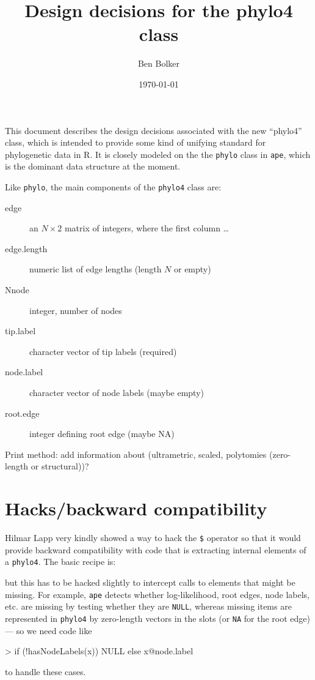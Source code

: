 \documentclass{article}
\title{Design decisions for the phylo4 class}
\author{Ben Bolker}
\date{\today}
\newcommand{\code}[1]{{{\tt #1}}}
\begin{document}
\maketitle

This document describes the design decisions associated
with the new ``phylo4'' class, which is intended to
provide some kind of unifying standard for phylogenetic
data in R.  It is closely modeled on the the \code{phylo}
class in \code{ape}, which is the dominant data structure
at the moment.

Like \code{phylo}, the main components of
the \code{phylo4} class are:
\begin{description}
\item[edge]{an $N \times 2$ matrix of integers,
  where the first column \ldots}
\item[edge.length]{numeric list of edge lengths
(length $N$ or empty)}
\item[Nnode]{integer, number of nodes}
\item[tip.label]{character vector of tip labels (required)}
\item[node.label]{character vector of node labels (maybe empty)}
\item[root.edge]{integer defining root edge (maybe NA)}
\end{description}

Print method: add information about
(ultrametric, scaled, polytomies (zero-length or structural))?
 
\section{Hacks/backward compatibility}

Hilmar Lapp very kindly showed a way to hack
the \verb+$+ operator so that it would provide
backward compatibility with code that is 
extracting internal elements of a \code{phylo4}.
The basic recipe is:
\begin{Schunk}
\end{Schunk}
but this has to be hacked slightly to intercept
calls to elements that might be missing.  For example,
\code{ape} detects whether log-likelihood, root edges,
node labels, etc. are missing by testing whether they
are \code{NULL}, whereas missing items are represented
in \code{phylo4} by zero-length vectors in the slots 
(or \code{NA} for the root edge) --- so we need code
like
\begin{Schunk}
\begin{Sinput}
> if (!hasNodeLabels(x)) NULL else x@node.label
\end{Sinput}
\end{Schunk}
to handle these cases.
\end{document}
